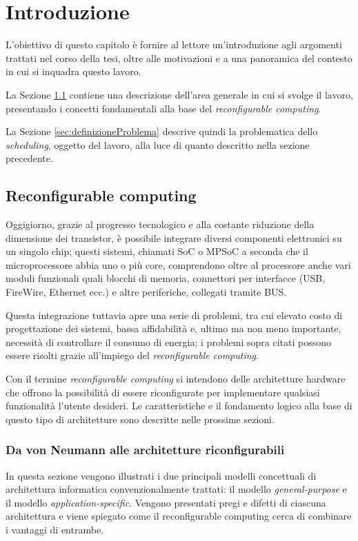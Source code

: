 \chapter{Introduzione}
\label{chap:intro}
\vspace{1cm}
L'obiettivo di questo capitolo è fornire al lettore un'introduzione agli argomenti 
trattati nel corso della tesi, oltre alle motivazioni e a una panoramica del contesto in 
cui si inquadra questo lavoro.

La Sezione \ref{sec:reconfComp} contiene una descrizione dell'area generale in cui si 
svolge il lavoro, presentando i concetti fondamentali alla base del \emph{reconfigurable 
computing}.

La Sezione \ref{sec:definizioneProblema} descrive quindi la problematica dello 
\emph{scheduling}, oggetto del lavoro, alla luce di quanto descritto nella sezione 
precedente.


\section{Reconfigurable computing}
\label{sec:reconfComp}
Oggigiorno, grazie al progresso tecnologico e alla costante riduzione della dimensione 
dei transistor, è possibile integrare diversi componenti elettronici su un singolo chip; 
questi sistemi, chiamati \ac{SoC} \cite{SoCBook} o \ac{MPSoC} \cite{MPSoCBook} a seconda
che il microprocessore abbia  uno o più core, comprendono oltre al processore anche vari
moduli funzionali quali blocchi di memoria, connettori per interfacce (USB, FireWire,
Ethernet ecc.) e altre periferiche, collegati tramite BUS.

Questa integrazione tuttavia apre una serie di problemi, tra cui elevato costo di 
progettazione dei sistemi, bassa affidabilità e, ultimo ma non meno importante,
necessità di controllare il consumo di energia; i problemi sopra citati possono
essere risolti grazie all'impiego del  \emph{reconfigurable computing}.

Con il termine \emph{reconfigurable computing} si intendono delle architetture hardware che 
offrono la possibilità di essere riconfigurate per implementare qualsiasi funzionalità 
l'utente desideri. Le caratteristiche e il fondamento logico alla base di questo tipo di 
architetture sono descritte nelle prossime sezioni.

\subsection{Da von Neumann alle architetture riconfigurabili}
\label{subsec:cambioParadigma}
In questa sezione vengono illustrati i due principali modelli concettuali di architettura
informatica convenzionalmente trattati: il modello \emph{general-purpose} e il modello
\emph{application-specific}. Vengono presentati pregi e difetti di ciascuna architettura
e viene spiegato come il reconfigurable computing cerca di combinare i vantaggi di
entrambe.

